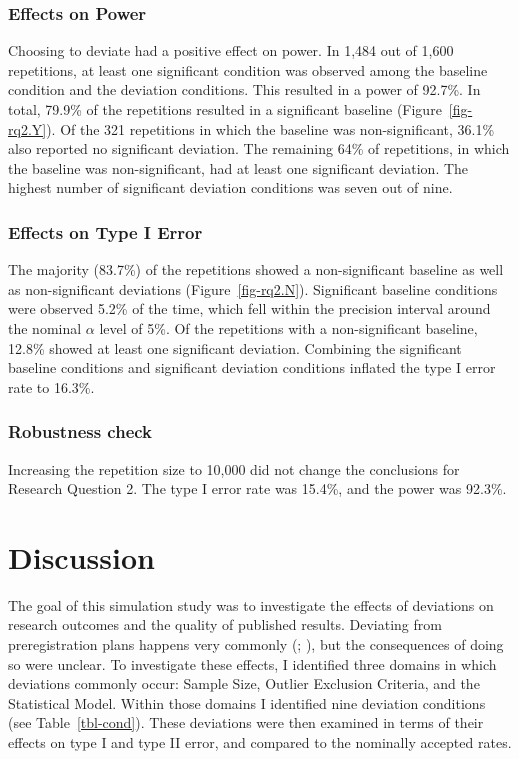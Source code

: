\documentclass[
  man,
  floatsintext,
  longtable,
  nolmodern,
  notxfonts,
  notimes,
  colorlinks=true,linkcolor=blue,citecolor=blue,urlcolor=blue]{apa7}
\begin{document}
\subsubsection{Effects on Power}\label{effects-on-power}

Choosing to deviate had a positive effect on power. In 1,484 out of
1,600 repetitions, at least one significant condition was observed among
the baseline condition and the deviation conditions. This resulted in a
power of 92.7\%. In total, 79.9\% of the repetitions resulted in a
significant baseline (Figure~\ref{fig-rq2.Y}). Of the 321 repetitions in
which the baseline was non-significant, 36.1\% also reported no
significant deviation. The remaining 64\% of repetitions, in which the
baseline was non-significant, had at least one significant deviation.
The highest number of significant deviation conditions was seven out of
nine.

\subsubsection{Effects on Type I Error}\label{effects-on-type-i-error}

The majority (83.7\%) of the repetitions showed a non-significant
baseline as well as non-significant deviations (Figure~\ref{fig-rq2.N}).
Significant baseline conditions were observed 5.2\% of the time, which
fell within the precision interval around the nominal \(\alpha\) level
of 5\%. Of the repetitions with a non-significant baseline, 12.8\%
showed at least one significant deviation. Combining the significant
baseline conditions and significant deviation conditions inflated the
type I error rate to 16.3\%.

\subsubsection{Robustness check}\label{robustness-check-1}

Increasing the repetition size to 10,000 did not change the conclusions
for Research Question 2. The type I error rate was 15.4\%, and the power
was 92.3\%.

\section{Discussion}\label{discussion}

The goal of this simulation study was to investigate the effects of
deviations on research outcomes and the quality of published results.
Deviating from preregistration plans happens very commonly
(;
),
but the consequences of doing so were unclear. To investigate these
effects, I identified three domains in which deviations commonly occur:
Sample Size, Outlier Exclusion Criteria, and the Statistical Model.
Within those domains I identified nine deviation conditions (see
Table~\ref{tbl-cond}). These deviations were then examined in terms of
their effects on type I and type II error, and compared to the nominally
accepted rates.
\end{document}
